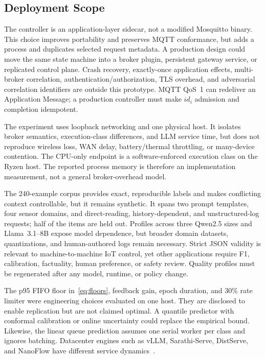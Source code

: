 \subsection{Deployment Scope}

The controller is an application-layer sidecar, not a modified Mosquitto binary. This choice improves portability and preserves MQTT conformance, but adds a process and duplicates selected request metadata. A production design could move the same state machine into a broker plugin, persistent gateway service, or replicated control plane. Crash recovery, exactly-once application effects, multi-broker correlation, authentication/authorization, TLS overhead, and adversarial correlation identifiers are outside this prototype. MQTT QoS~1 can redeliver an Application Message; a production controller must make $id_i$ admission and completion idempotent.

The experiment uses loopback networking and one physical host. It isolates broker semantics, execution-class differences, and LLM service time, but does not reproduce wireless loss, WAN delay, battery/thermal throttling, or many-device contention. The CPU-only endpoint is a software-enforced execution class on the Ryzen host. The reported process memory is therefore an implementation measurement, not a general broker-overhead model.

The 240-example corpus provides exact, reproducible labels and makes conflicting context controllable, but it remains synthetic. It spans two prompt templates, four sensor domains, and direct-reading, history-dependent, and unstructured-log requests; half of the items are held out. Profiles across three Qwen2.5 sizes and Llama~3.1--8B expose model dependence, but broader domain datasets, quantizations, and human-authored logs remain necessary. Strict JSON validity is relevant to machine-to-machine IoT control, yet other applications require F1, calibration, factuality, human preference, or safety review. Quality profiles must be regenerated after any model, runtime, or policy change.

The p95 FIFO floor in~\eqref{eq:floors}, feedback gain, epoch duration, and 30\% rate limiter were engineering choices evaluated on one host. They are disclosed to enable replication but are not claimed optimal. A quantile predictor with conformal calibration or online uncertainty could replace the empirical bound. Likewise, the linear queue prediction assumes one serial worker per class and ignores batching. Datacenter engines such as vLLM, Sarathi-Serve, DistServe, and NanoFlow have different service dynamics~\cite{kwon2023vllm,agrawal2024sarathi,zhong2024distserve,zhu2025nanoflow}.

